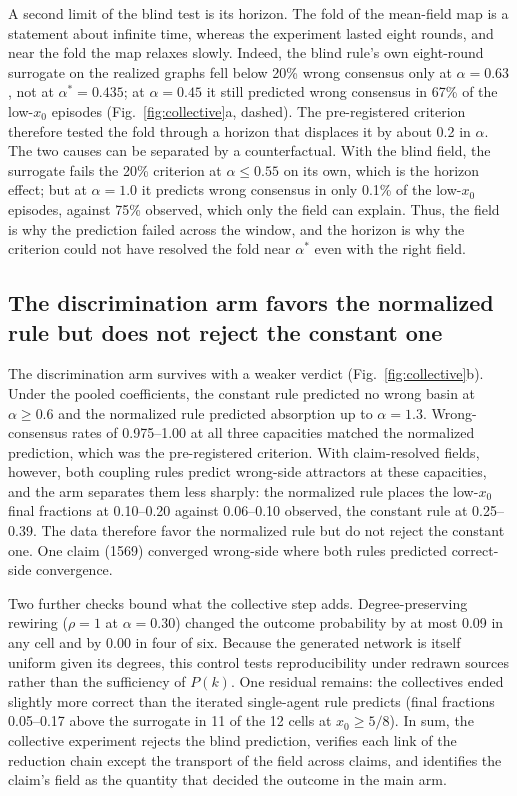 \documentclass[11pt]{article}
\newcommand{\astar}{\alpha^{*}}
\begin{document}
A second limit of the blind test is its horizon. The fold of the
mean-field map is a statement about infinite time, whereas the experiment
lasted eight rounds, and near the fold the map relaxes slowly. Indeed, the
blind rule's own eight-round surrogate on the realized graphs fell below
20\% wrong consensus only at $\alpha = 0.63$, not at $\astar = 0.435$; at
$\alpha = 0.45$ it still predicted wrong consensus in 67\% of the low-$x_0$
episodes (Fig.~\ref{fig:collective}a, dashed). The pre-registered
criterion therefore tested the fold through a horizon that displaces it by
about 0.2 in $\alpha$. The two causes can be separated by a counterfactual.
With the blind field, the surrogate fails the 20\% criterion at
$\alpha \le 0.55$ on its own, which is the horizon effect; but at
$\alpha = 1.0$ it predicts wrong consensus in only 0.1\% of the low-$x_0$
episodes, against 75\% observed, which only the field can explain. Thus,
the field is why the prediction failed across the window, and the horizon
is why the criterion could not have resolved the fold near $\astar$ even
with the right field.

\subsection{The discrimination arm favors the normalized rule but does not reject the constant one}

The discrimination arm survives with a weaker verdict
(Fig.~\ref{fig:collective}b). Under the pooled coefficients, the constant
rule predicted no wrong basin at $\alpha \ge 0.6$ and the normalized rule
predicted absorption up to $\alpha = 1.3$. Wrong-consensus rates of
0.975--1.00 at all three capacities matched the normalized prediction,
which was the pre-registered criterion. With claim-resolved fields,
however, both coupling rules predict wrong-side attractors at these
capacities, and the arm separates them less sharply: the normalized rule
places the low-$x_0$ final fractions at 0.10--0.20 against 0.06--0.10
observed, the constant rule at 0.25--0.39. The data therefore favor the
normalized rule but do not reject the constant one. One claim (1569)
converged wrong-side where both rules predicted correct-side convergence.

Two further checks bound what the collective step adds. Degree-preserving
rewiring ($\rho = 1$ at $\alpha = 0.30$) changed the outcome probability by
at most 0.09 in any cell and by 0.00 in four of six. Because the generated
network is itself uniform given its degrees, this control tests
reproducibility under redrawn sources rather than the sufficiency of
$P(k)$. One residual remains: the collectives ended slightly more correct
than the iterated single-agent rule predicts (final fractions 0.05--0.17
above the surrogate in 11 of the 12 cells at $x_0 \ge 5/8$). In sum, the
collective experiment rejects the blind prediction, verifies each link of
the reduction chain except the transport of the field across claims, and
identifies the claim's field as the quantity that decided the outcome in
the main arm.
\end{document}
